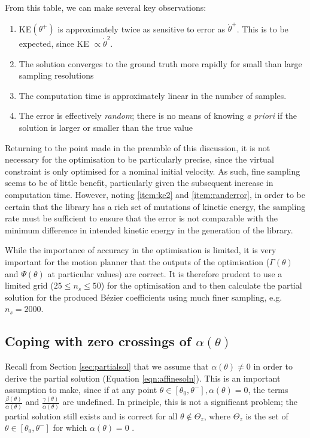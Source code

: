 From this table, we can make several key observations:
\begin{adjustwidth}{0.5cm}{}
\begin{enumerate}[label=\bfseries Obs \arabic*, parsep=0pt]
	\item KE$(\theta^+)$ is approximately twice as sensitive to error as $\dot{\theta}^+$. This is to be expected, since KE $\propto \dot{\theta}^2$. \label{item:ke2}
	\item The solution converges to the ground truth more rapidly for small than large sampling resolutions
	\item The computation time is approximately linear in the number of samples.
	\item The error is effectively \textit{random}; there is no means of knowing \textit{a priori} if the solution is larger or smaller than the true value \label{item:randerror}
\end{enumerate}
\end{adjustwidth}

Returning to the point made in the preamble of this discussion, it is not necessary for the optimisation to be particularly precise, since the virtual constraint is only optimised for a nominal initial velocity. As such, fine sampling seems to be of little benefit, particularly given the subsequent increase in computation time. However, noting \ref{item:ke2} and \ref{item:randerror}, in order to be certain that the library has a rich set of mutations of kinetic energy, the sampling rate must be sufficient to ensure that the error is not comparable with the minimum difference in intended kinetic energy in the generation of the library.

While the importance of accuracy in the optimisation is limited, it is very important for the motion planner that the outputs of the optimisation ($\Gamma(\theta)$ and $\Psi(\theta)$ at particular values) are correct. It is therefore prudent to use a limited grid ($25 \leq n_s \leq 50$) for the optimisation and to then calculate the partial solution for the produced Bézier coefficients using much finer sampling, e.g. $n_s = 2000$. 

\subsection{Coping with zero crossings of $\alpha(\theta)$} \label{sec:alphazerocrossing}
Recall from Section \ref{sec:partialsol} that we assume that $\alpha(\theta)\neq 0$ in order to derive the partial solution (Equation \ref{eqn:affinesoln}). This is an important assumption to make, since if at any point $\theta \in [\theta_0, \theta^-], \alpha(\theta) = 0$, the terms $\frac{\beta(\theta)}{\alpha(\theta)}$ and $\frac{\gamma(\theta)}{\alpha(\theta)}$ are undefined. In principle, this is not a significant problem; the partial solution still exists and is correct for all $\theta \not \in \Theta_z$, where $\Theta_z$ is the set of $\theta \in [\theta_0, \theta^-]$ for which $\alpha(\theta)=0$ \cite{shiriaev2005constructive}.


